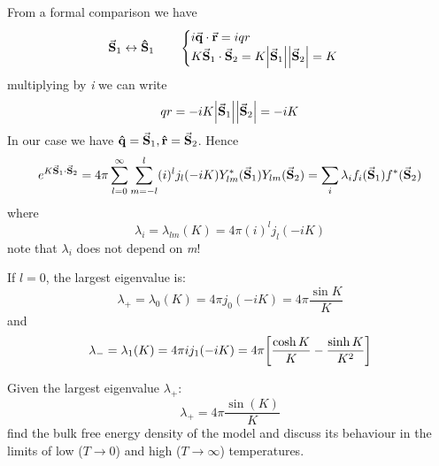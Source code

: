\documentclass[../main/main.tex]{subfiles}
\begin{document}
From a formal comparison we have
  \begin{equation}
    \va{S}_1 \leftrightarrow \vu{S}_1 \qquad
      \begin{cases}
           i \va{q}\cdot \va{r} = iqr \\
           K \va{S}_1 \cdot \va{S}_2 = K \abs{\va{S}_1} \abs{\va{S}_2} = K
      \end{cases}
  \end{equation}
  multiplying by \emph{i} we can write
  \begin{equation}
    qr = -iK \abs{\va{S}_1} \abs{\va{S}_2} = -iK
  \end{equation}
  In our case we have
  \( \vu{q} = \va{S}_1, \vu{r} = \va{S}_2 \). Hence
  \begin{equation}
    e^{K \va{S}_1 \cdot \va{S}_2} = 4 \pi  \sum_{l=0}^{\infty } \sum_{m=-l}^{l} (i)^l j_l (-iK) Y_{lm}^* (\va{S}_1) Y_{lm} (\va{S}_2) = \sum_{i}^{} \lambda _i f_i (\va{S}_1) f^* (\va{S}_2)
  \end{equation}
where
\begin{equation}
  \lambda _i = \lambda _{lm} (K) = 4 \pi (i)^l j_l (-iK)
\end{equation}
note that \( \lambda _i \) does not depend on \emph{m}!

If \( l=0 \), the largest eigenvalue is:
\begin{equation}
  \lambda _+ = \lambda _0 (K) = 4 \pi j_0 (-iK) = 4 \pi \frac{\sin K }{K}
\end{equation}
and
\begin{equation}
  \lambda _- = \lambda _1 (K) = 4 \pi i j_1 (-iK) = 4 \pi \qty[\frac{\cosh K }{K}-\frac{\sinh K }{K^2}]
\end{equation}

\begin{exercise}
Given the largest eigenvalue \( \lambda _+ \):
\begin{equation}
  \lambda _+ = 4 \pi \frac{\sin(K) }{K}
\end{equation}
find the bulk free energy density of the model and discuss its behaviour in the limits of low (\( T \rightarrow 0 \)) and high (\( T \rightarrow \infty  \)) temperatures.
\end{exercise}
\end{document}
